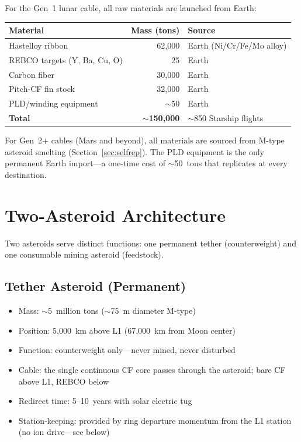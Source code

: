 \documentclass[12pt,letterpaper]{article}
\begin{document}
For the Gen~1 lunar cable, all raw materials are launched from Earth:

\begin{center}
\small
\begin{tabular}{lrl}
\toprule
\textbf{Material} & \textbf{Mass (tons)} & \textbf{Source} \\
\midrule
Hastelloy ribbon & 62{,}000 & Earth (Ni/Cr/Fe/Mo alloy) \\
REBCO targets (Y, Ba, Cu, O) & 25 & Earth \\
Carbon fiber & 30{,}000 & Earth \\
Pitch-CF fin stock & 32{,}000 & Earth \\
PLD/winding equipment & ${\sim}$50 & Earth \\
\midrule
\textbf{Total} & ${\sim}$\textbf{150{,}000} & ${\sim}$850 Starship flights \\
\bottomrule
\end{tabular}
\end{center}

For Gen~2+ cables (Mars and beyond), all materials are sourced from M-type asteroid smelting (Section~\ref{sec:selfrep}). The PLD equipment is the only permanent Earth import---a one-time cost of ${\sim}$50~tons that replicates at every destination.

\section{Two-Asteroid Architecture}

Two asteroids serve distinct functions: one permanent tether (counterweight) and one consumable mining asteroid (feedstock).

\subsection{Tether Asteroid (Permanent)}

\begin{itemize}
\item Mass: ${\sim}$5~million tons (${\sim}$75~m diameter M-type)
\item Position: 5{,}000~km above L1 (67{,}000~km from Moon center)
\item Function: counterweight only---never mined, never disturbed
\item Cable: the single continuous CF core passes through the asteroid; bare CF above L1, REBCO below
\item Redirect time: 5--10~years with solar electric tug
\item Station-keeping: provided by ring departure momentum from the L1 station (no ion drive---see below)
\end{itemize}
\end{document}

